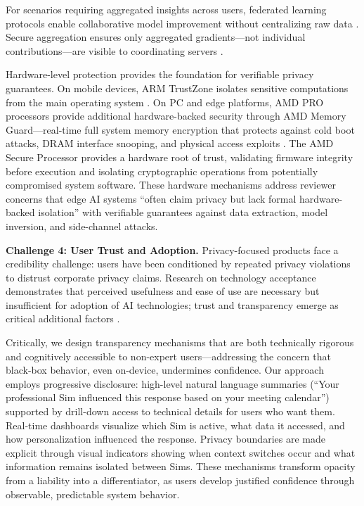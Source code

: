 \documentclass[11pt]{article}
\begin{document}
For scenarios requiring aggregated insights across users, federated learning 
protocols enable collaborative model improvement without centralizing raw 
data \cite{mcmahan2017communication}. Secure aggregation ensures only 
aggregated gradients---not individual contributions---are visible to 
coordinating servers \cite{bonawitz2017practical}.

Hardware-level protection provides the foundation for verifiable privacy 
guarantees. On mobile devices, ARM TrustZone isolates sensitive computations 
from the main operating system \cite{pinto2019demystifying}. On PC and edge 
platforms, AMD PRO processors provide additional hardware-backed security 
through AMD Memory Guard---real-time full system memory encryption that 
protects against cold boot attacks, DRAM interface snooping, and physical 
access exploits \cite{amd2024prosecurity}. The AMD Secure Processor provides 
a hardware root of trust, validating firmware integrity before execution and 
isolating cryptographic operations from potentially compromised system 
software. These hardware mechanisms address reviewer concerns that edge AI 
systems ``often claim privacy but lack formal hardware-backed isolation'' 
with verifiable guarantees against data extraction, model inversion, and 
side-channel attacks.

\textbf{Challenge 4: User Trust and Adoption.}
Privacy-focused products face a credibility challenge: users have been conditioned by repeated privacy violations to distrust corporate privacy claims. Research on technology acceptance demonstrates that perceived usefulness and ease of use are necessary but insufficient for adoption of AI technologies; trust and transparency emerge as critical additional factors \cite{davis1989perceived, sohn2020technology}.

Critically, we design transparency mechanisms that are both technically 
rigorous and cognitively accessible to non-expert users---addressing the 
concern that black-box behavior, even on-device, undermines confidence. 
Our approach employs progressive disclosure: high-level natural language 
summaries (``Your professional Sim influenced this response based on your 
meeting calendar'') supported by drill-down access to technical details 
for users who want them. Real-time dashboards visualize which Sim is active, 
what data it accessed, and how personalization influenced the response. 
Privacy boundaries are made explicit through visual indicators showing 
when context switches occur and what information remains isolated between 
Sims. These mechanisms transform opacity from a liability into a 
differentiator, as users develop justified confidence through observable, 
predictable system behavior.
\end{document}
